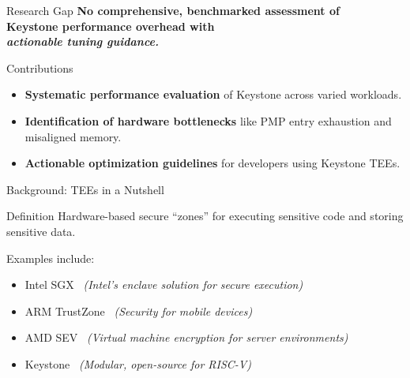 \documentclass[aspectratio=169]{beamer}
\begin{document}
\begin{frame}{Research Gap}
\centering
\Large\bfseries
No comprehensive, benchmarked assessment of \\
\textbf{Keystone} performance overhead with \\
\textit{actionable tuning guidance.}
\end{frame}

\begin{frame}{Contributions}
\begin{itemize}
    \item \textbf{Systematic performance evaluation} of Keystone across varied workloads.
    \item \textbf{Identification of hardware bottlenecks} like PMP entry exhaustion and misaligned memory.
    \item \textbf{Actionable optimization guidelines} for developers using Keystone TEEs.
\end{itemize}
\end{frame}

\begin{frame}{Background: TEEs in a Nutshell}
\begin{block}{Definition}
Hardware-based secure “zones” for executing sensitive code and storing sensitive data.
\end{block}
Examples include:
\begin{itemize}
    \item Intel SGX \faMicrochip\ \textit{(Intel's enclave solution for secure execution)} 
    \item ARM TrustZone \faLock\ \textit{(Security for mobile devices)}
    \item AMD SEV \faServer\ \textit{(Virtual machine encryption for server environments)}
    \item Keystone \faKey\ \textit{(Modular, open-source for RISC-V)}
\end{itemize}
\end{frame}

\end{document}
